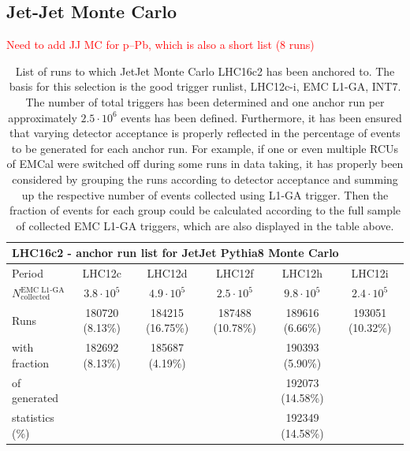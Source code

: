 \documentclass[ALICE]{ALICE_analysis_notes}
\newcommand{\pPb}{{\mbox{p--Pb}}\xspace}
\begin{document}
\begin{appendix}
\newpage

\subsection{Jet-Jet Monte Carlo}	
\label{subsec:runsJJMC}
\textcolor{red}{Need to add JJ MC for \pPb, which is also a short list (8 runs)}

\begin{table}[h!]
	\hspace*{-0.2cm}
	\small
	\centering
	\begin{tabular}{lccccc}  
	    \toprule
		\multicolumn{6}{l}{\textbf{LHC16c2 - anchor run list for JetJet Pythia8 Monte Carlo}} \\ \midrule
		Period & LHC12c & LHC12d & LHC12f & LHC12h & LHC12i\\
		$N^{\text{EMC L1-GA}}_{\text{collected}}$ & $3.8 \cdot 10^{5}$ & $4.9 \cdot 10^{5}$ & $2.5 \cdot 10^{5}$ & $9.8 \cdot 10^{5}$ & $2.4 \cdot 10^{5}$\\ \midrule
		Runs 			 & 180720 (8.13\%) & 184215 (16.75\%) & 187488 (10.78\%) & 189616 (6.66\%) & 193051 (10.32\%) \\
		with fraction	 & 182692 (8.13\%) & 185687 (4.19\%) &  & 190393 (5.90\%) &  \\
		of generated	 &  &  &  & 192073 (14.58\%) &  \\
		statistics (\%)	 &  &  &  & 192349 (14.58\%) &  \\
		\bottomrule
	\end{tabular}
	\caption{List of runs to which JetJet Monte Carlo LHC16c2 has been anchored to. The basis for this selection is the good trigger runlist, LHC12c-i, EMC L1-GA, INT7. The number of total triggers has been determined and one anchor run per approximately $ 2.5 \cdot 10^{6}$ events has been defined. Furthermore, it has been ensured that varying detector acceptance is properly reflected in the percentage of events to be generated for each anchor run. For example, if one or even multiple RCUs of EMCal were switched off during some runs in data taking, it has properly been considered by grouping the runs according to detector acceptance and summing up the respective number of events collected using L1-GA trigger. Then the fraction of events for each group could be calculated according to the full sample of collected EMC L1-GA triggers, which are also displayed in the table above.}
	\label{tab:runsJetJet}
\end{table}

\newpage


\end{appendix}
\end{document}
